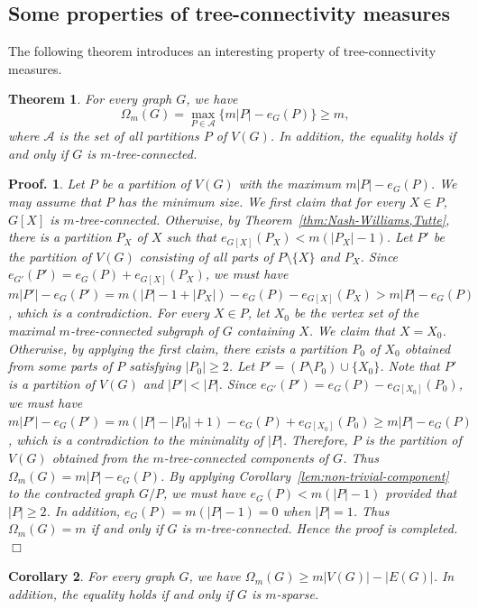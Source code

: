 \documentclass[10pt,bezier]{article}
\newtheorem{prethm}{{\bf Theorem}}[section]
\newenvironment{thm}{\begin{prethm}{\hspace{-0.5
em}{\bf.}}}{\end{prethm}}
\newtheorem{precor}[prethm]{{\bf Corollary}}
\newenvironment{cor}{\begin{precor}{\hspace{-0.5
em}{\bf.}}}{\end{precor}}
\newtheorem{preproof}{{\bf Proof.}}
\newenvironment{proof}[1]{\begin{preproof}{\rm
#1}\hfill{$\Box$}}{\end{preproof}}
\begin{document}
\subsection{Some properties of tree-connectivity measures}
\label{sec:properties:measures}
%
The following theorem introduces an interesting property of tree-connectivity measures.
%
\begin{thm}\label{thm:maximum-partition}
{For every graph $G$, we have 
$$\Omega_m(G)=\max_{P\in \mathcal{A}}\{m|P|-e_G(P)\}\ge m,$$
where $\mathcal{A}$ is the set of all partitions $P$ of $V(G)$. In addition, the equality holds if and only if $G$ is $m$-tree-connected.
}\end{thm}
%
\begin{proof}
{Let $P$ be a partition of $V(G)$ with the maximum $m|P|-e_G(P)$.
 We may assume that $P$ has the minimum size.
We first claim that for every $X\in P$, $G[X]$ is $m$-tree-connected.
Otherwise, by Theorem~\ref{thm:Nash-Williams,Tutte}, there is a partition $P_X$ of $X$ such that $e_{G[X]}(P_X)<m (|P_X|-1)$.
Let $P'$ be the partition of $V(G)$ consisting of all parts of $P\setminus \{X\}$ and $P_X$.
Since $e_{G'}(P')=e_{G}(P)+e_{G[X]}(P_X)$, 
we must have $m|P'|-e_G(P')=m(|P|-1+|P_X|)-e_{G}(P)-e_{G[X]}(P_X)> m|P|-e_G(P) $, which is a contradiction. 
%
For every $X\in P$, let $X_0$ be the vertex set of the maximal $m$-tree-connected subgraph of $G$ containing $X$.
We claim that $X=X_0$.
Otherwise, by applying the first claim, there exists a partition $P_0$ of $X_0$ obtained from some parts of $P$ satisfying $|P_0|\ge 2$.
Let $P'=(P\setminus P_0) \cup \{X_0\}$. 
Note that $P'$ is a partition of $V(G)$ and $|P'| < |P|$.
Since $e_{G'}(P')=e_{G}(P)-e_{G[X_0]}(P_0)$, we must have 
$m|P'|-e_G(P')=m(|P|-|P_0|+1)-e_{G}(P)+e_{G[X_0]}(P_0)\ge m|P|-e_G(P) $, which is a contradiction to the minimality of $|P|$. 
Therefore, $P$ is the partition of $V(G)$ obtained from the $m$-tree-connected components of $G$. 
Thus $\Omega_m(G) =m|P|-e_G(P)$.
By applying Corollary~\ref{lem:non-trivial-component} to the contracted graph $G/P$, 
we must have $e_G(P)<m(|P|-1)$ provided that $|P|\ge 2$.
In addition, $e_G(P)=m(|P|-1)=0$ when $|P|=1$. 
 Thus $\Omega_m(G)=m$ if and only if $G$ is $m$-tree-connected.
Hence the proof is completed.
}\end{proof}
%
%
\begin{cor}\label{cor:maximum-partition}
{For every graph $G$, we have $\Omega_m(G) \ge m|V(G)|-|E(G)|$.
In addition, the equality holds if and only if $G$ is $m$-sparse.
}\end{cor}
\end{document}
